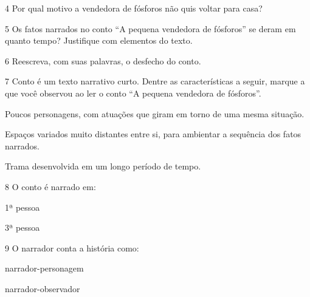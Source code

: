 \num{4} Por qual motivo a vendedora de fósforos não quis voltar para casa?


\num{5} Os fatos narrados no conto ``A pequena vendedora de fósforos'' se
deram em quanto tempo? Justifique com elementos do texto.


\num{6} Reescreva, com suas palavras, o desfecho do conto.


\num{7} Conto é um texto narrativo curto. Dentre as características a seguir,
marque a que você observou ao ler o conto ``A pequena vendedora de
fósforos''.

\begin{boxlist}
 Poucos personagens, com atuações que giram em torno de uma mesma
situação.

 Espaços variados muito distantes entre si, para ambientar a
sequência dos fatos narrados.

 Trama desenvolvida em um longo período de tempo.
\end{boxlist}

\num{8} O conto é narrado em:

\begin{boxlist}
 1ª pessoa

 3ª pessoa
\end{boxlist}

\num{9} O narrador conta a história como:


\begin{boxlist}
 narrador-personagem

 narrador-observador
\end{boxlist}

